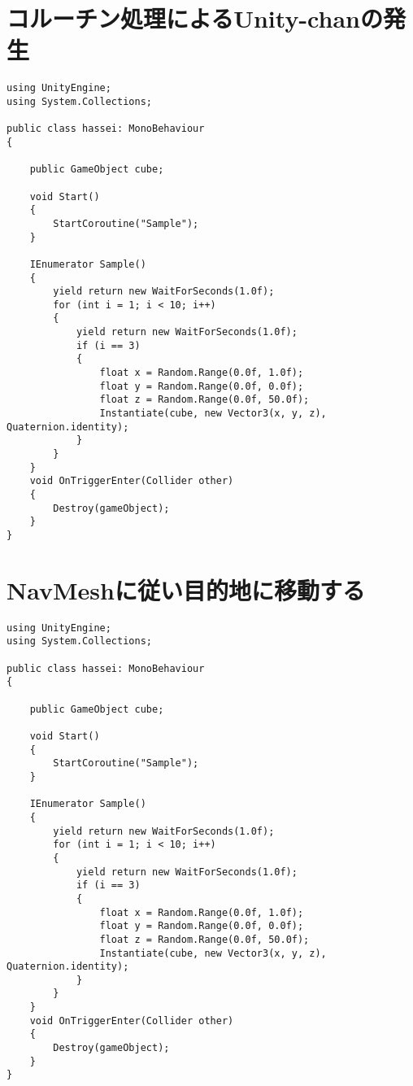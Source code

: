 ﻿%

\appendix
\chapter{コルーチン処理によるUnity-chanの発生}

\begin{verbatim}
using UnityEngine;
using System.Collections;

public class hassei: MonoBehaviour
{

    public GameObject cube;

    void Start()
    {
        StartCoroutine("Sample");
    }

    IEnumerator Sample()
    {
        yield return new WaitForSeconds(1.0f);
        for (int i = 1; i < 10; i++)
        {
            yield return new WaitForSeconds(1.0f);
            if (i == 3)
            {
                float x = Random.Range(0.0f, 1.0f);
                float y = Random.Range(0.0f, 0.0f);
                float z = Random.Range(0.0f, 50.0f);
                Instantiate(cube, new Vector3(x, y, z), Quaternion.identity);
            }
        }
    }
    void OnTriggerEnter(Collider other)
    {
        Destroy(gameObject);
    }
}
\end{verbatim}

\chapter{NavMeshに従い目的地に移動する}

\begin{verbatim}
using UnityEngine;
using System.Collections;

public class hassei: MonoBehaviour
{

    public GameObject cube;

    void Start()
    {
        StartCoroutine("Sample");
    }

    IEnumerator Sample()
    {
        yield return new WaitForSeconds(1.0f);
        for (int i = 1; i < 10; i++)
        {
            yield return new WaitForSeconds(1.0f);
            if (i == 3)
            {
                float x = Random.Range(0.0f, 1.0f);
                float y = Random.Range(0.0f, 0.0f);
                float z = Random.Range(0.0f, 50.0f);
                Instantiate(cube, new Vector3(x, y, z), Quaternion.identity);
            }
        }
    }
    void OnTriggerEnter(Collider other)
    {
        Destroy(gameObject);
    }
}
\end{verbatim}


